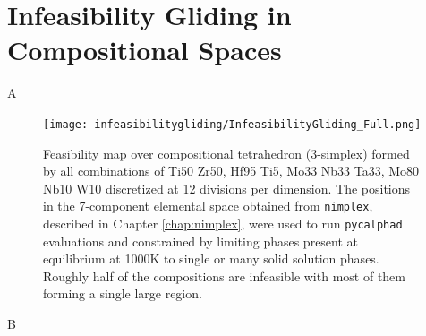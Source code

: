 \chapter{Infeasibility Gliding in Compositional Spaces} \label{chap:infeasibilitygliding}


A

\begin{figure}[h]
    \centering
    \texttt{[image: infeasibilitygliding/InfeasibilityGliding\_Full.png]}
    \caption{Feasibility map over compositional tetrahedron (3-simplex) formed by all combinations of Ti50 Zr50, Hf95 Ti5, Mo33 Nb33 Ta33, Mo80 Nb10 W10 discretized at 12 divisions per dimension. The positions in the 7-component elemental space obtained from \texttt{nimplex}, described in Chapter \ref{chap:nimplex}, were used to run \texttt{pycalphad} \cite{Otis2017Pycalphad:Python} evaluations and constrained by limiting phases present at equilibrium at 1000K to single or many solid solution phases. Roughly half of the compositions are infeasible with most of them forming a single large region.}
    \label{infeasibilitygliding:fig:fullcomputation}
\end{figure}

B

